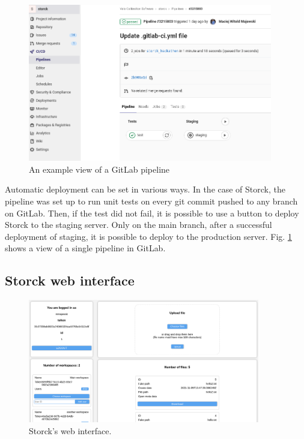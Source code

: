 \begin{figure}[H]
\centering
\includegraphics[width=0.95\textwidth]{figures/chapter5/storck/storck_gitlab.png}
\caption{An example view of a GitLab pipeline}
\label{fig:storck-gitlab}
\end{figure}

Automatic deployment can be set in various ways.
In the case of Storck, the pipeline was set up to run unit tests on every git commit pushed to any branch on GitLab.
Then, if the test did not fail, it is possible to use a button to deploy Storck to the staging server.
Only on the main branch, after a successful deployment of staging, it is possible to deploy to the production server.
Fig. \ref{fig:storck-gitlab} shows a view of a single pipeline in GitLab.

\subsection{Storck web interface}

\begin{figure}[H]
\centering
\includegraphics[width=0.9\textwidth]{figures/chapter5/storck/screenshot_web.png}
\caption{Storck's web interface.}
\label{fig:storck-web-interface}
\end{figure}


